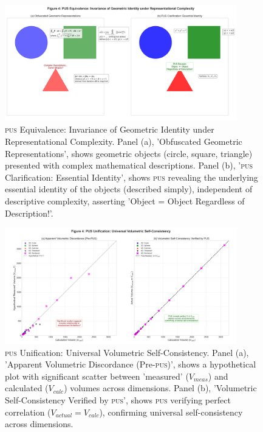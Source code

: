 \documentclass[11pt, a4paper]{article}
\newcommand{\pus}{\textsc{pus}} %
\begin{document}
\FloatBarrier

\begin{figure}[htbp]
    \centering
    \includegraphics[width=0.9\textwidth]{figures/pus_figure4_geometric_identity.png} %
    \caption{\pus{} Equivalence: Invariance of Geometric Identity under Representational Complexity. Panel (a), 'Obfuscated Geometric Representations', shows geometric objects (circle, square, triangle) presented with complex mathematical descriptions. Panel (b), '\pus{} Clarification: Essential Identity', shows \pus{} revealing the underlying essential identity of the objects (described simply), independent of descriptive complexity, asserting 'Object = Object Regardless of Description!'.}
    \label{fig:equivalence}
\end{figure}
\FloatBarrier 

\begin{figure}[htbp]
    \centering
    \includegraphics[width=0.9\textwidth]{figures/pus_figure4_volume_comparison_highD.png} %
    \caption{\pus{} Unification: Universal Volumetric Self-Consistency. Panel (a), 'Apparent Volumetric Discordance (Pre-\pus)', shows a hypothetical plot with significant scatter between 'measured' ($V_{meas}$) and calculated ($V_{calc}$) volumes across dimensions. Panel (b), 'Volumetric Self-Consistency Verified by \pus', shows \pus{} verifying perfect correlation ($V_{actual} = V_{calc}$), confirming universal self-consistency across dimensions.}
    \label{fig:volume}
\end{figure}
\FloatBarrier 
\end{document}
